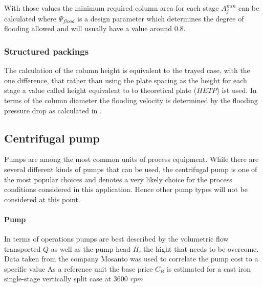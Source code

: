         
        
        With those values the minimum required column area for each stage $A_j^{min}$ can be calculated
        where $\Psi_{flood}$ is a design parameter which determines the degree of flooding allowed and will usually 
        have a value around $0.8$. 
     
    \subsubsection{Structured packings}
        The calculation of the column height is equivalent to the trayed case, with the one difference, that 
        rather than using the plate spacing as the height for each stage a value called height equivalent 
        to to theoretical plate ($HETP$) ist used. In terms of the column diameter the flooding velocity 
        is determined by the flooding pressure drop as calculated in . 

\subsection{Centrifugal pump}
		Pumps are among the most common units of process equipment. While there are several different
		kinds of pumps that can be used, the centrifugal pump is one of the most popular choices and
		denotes a very likely choice for the process conditions considered in this application. Hence
		other pump types will not be considered at this point.
		
		\paragraph{Pump}
			In terms of operations pumps are best described by the volumetric flow transported $Q$ as
			well as the pump head $H$, the hight that needs to be overcome. Data taken from the company
			Mosanto was used to correlate the pump cost to a specific value
			As a reference unit the base price $C_B$ is estimated for a cast iron single-stage
			vertically split case at 3600 $rpm$
			
